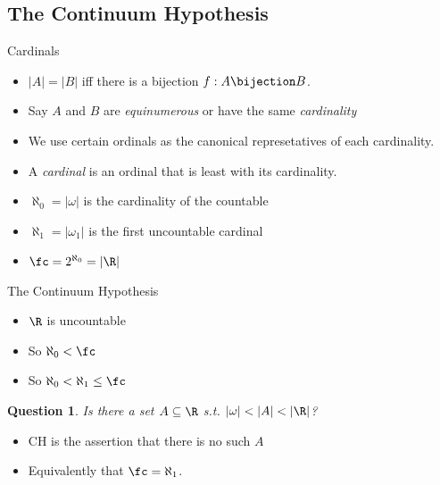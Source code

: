 \documentclass{beamer}
\newtheorem*{question}{Question}
\begin{document}
\subsection{The Continuum Hypothesis}

\begin{frame}{Cardinals}

\begin{definition}
\begin{itemize}
  \item $|A| = |B|$ iff there is a bijection $f:A\bijection B$.
  \item Say $A$ and $B$ are \emph{equinumerous} or have the same \emph{cardinality}
  \item We use certain ordinals as the canonical represetatives of each cardinality.
  \item A \emph{cardinal} is an ordinal that is least with its cardinality.
  \item  $\aleph_0 = |\omega|$ is the cardinality of the countable
  \item  $\aleph_1 = |\omega_1|$ is the first uncountable cardinal
  \item $\fc  = 2^{\aleph_0} = |\R|$
\end{itemize}
\end{definition}

\end{frame}

\begin{frame}{The Continuum Hypothesis}

\begin{fact}
\begin{itemize}
  \item $\R$ is uncountable
  \item So $\aleph_0 < \fc$
  \item So $\aleph_0 < \aleph_1 \leq \fc$
\end{itemize}
\end{fact}

\begin{question}
Is there a set $A \subseteq \R$ s.t. $|\omega| < |A| < |\R|$?
\end{question}

\begin{definition}
\begin{itemize}
  \item CH is the assertion that there is no such $A$
  \item Equivalently that $\fc = \aleph_1$.
\end{itemize}
\end{definition}

\end{frame}
\end{document}
